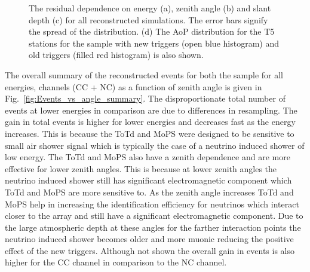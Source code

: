 \begin{figure}[h!]
  \centering
  \hfill
  \hfill
  \caption{The residual dependence on energy (a), zenith angle (b) and slant depth (c) for all reconstructed simulations. The error bars signify the spread of the distribution. (d) The AoP distribution for the T5 stations for the sample with new triggers (open blue histogram) and old triggers (filled red histogram) is also shown.}
  \label{fig:Res_comp}
\end{figure}
\FloatBarrier
The overall summary of the reconstructed events for both the sample for all energies, channels (CC + NC) as a function of zenith angle is given in Fig.~\ref{fig:Events_vs_angle_summary}. The disproportionate total number of events at lower energies in comparison are due to differences in resampling. The gain in total events is higher for lower energies and decreases fast as the energy increases. This is because the ToTd and MoPS were designed to be sensitive to small air shower signal which is typically the case of a neutrino induced shower of low energy. The ToTd and MoPS also have a zenith dependence and are more effective for lower zenith angles. This is because at lower zenith angles the neutrino induced shower still has significant electromagnetic component which ToTd and MoPS are more sensitive to. As the zenith angle increases ToTd and MoPS help in increasing the identification efficiency for neutrinos which interact closer to the array and still have a significant electromagnetic component. Due to the large atmospheric depth at these angles for the farther interaction points the neutrino induced shower becomes older and more muonic reducing the positive effect of the new triggers. Although not shown the overall gain in events is also higher for the CC channel in comparison to the NC channel. 

